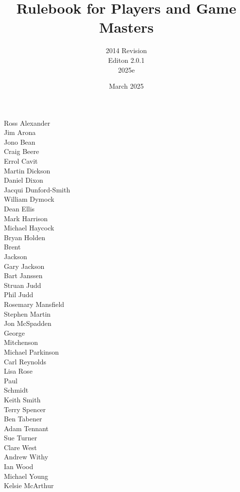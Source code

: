 \documentclass[a4paper]{report}
\begin{document}
\title{Rulebook for Players and Game Masters\\ \coverpic}
\author{2014 Revision\\Editon 2.0.1\\2025e}
\date{March 2025}

\maketitle

\begin{Contributors}
Ross Alexander \\
Jim Arona \\
Jono Bean \\
Craig Beere \\
Errol Cavit \\
Martin Dickson \\
Daniel Dixon \\
Jacqui Dunford-Smith \\
William Dymock \\
Dean Ellis \\
Mark Harrison \\
Michael Haycock \\
Bryan Holden \\
Brent \\
Jackson \\
Gary Jackson \\
Bart Janssen \\
Struan Judd \\
Phil Judd \\
Rosemary Mansfield \\
Stephen Martin \\
Jon McSpadden \\
George \\
Mitchenson \\
Michael Parkinson \\
Carl Reynolds \\
Lisa Rose \\
Paul \\
Schmidt \\
Keith Smith \\
Terry Spencer \\
Ben Tabener \\
Adam Tennant \\
Sue Turner \\
Clare West \\
Andrew Withy \\
Ian Wood \\
Michael Young \\
Kelsie McArthur \\
\end{Contributors}
\end{document}
